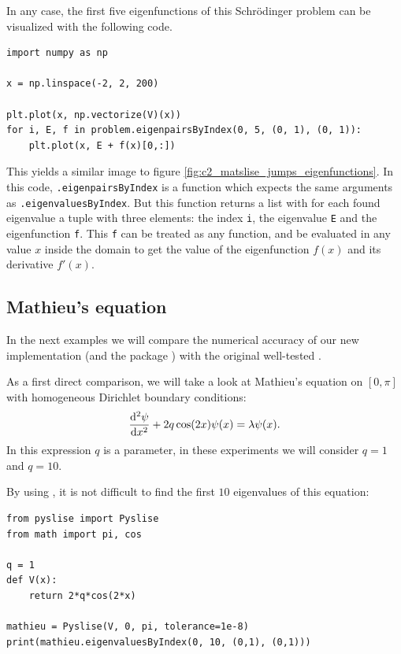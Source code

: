 In any case, the first five eigenfunctions of this Schrödinger problem can be visualized with the following code.
\begin{verbatim}
import numpy as np

x = np.linspace(-2, 2, 200)

plt.plot(x, np.vectorize(V)(x))
for i, E, f in problem.eigenpairsByIndex(0, 5, (0, 1), (0, 1)):
    plt.plot(x, E + f(x)[0,:])
\end{verbatim}
This yields a similar image to figure \ref{fig:c2_matslise_jumps_eigenfunctions}. In this code, \texttt{.eigenpairsByIndex} is a function which expects the same arguments as \texttt{.eigenvaluesByIndex}. But this function returns a list with for each found eigenvalue a tuple with three elements: the index \texttt{i}, the eigenvalue \texttt{E} and the eigenfunction \texttt{f}. This \texttt{f} can be treated as any \lpython{} function, and be evaluated in any value $x$ inside the domain to get the value of the eigenfunction $f(x)$ and its derivative $f'(x)$.

\subsection{Mathieu's equation}\label{sec:c2_numerical_experiments_mathieu}

In the next examples we will compare the numerical accuracy of our new implementation  (and the \lpython{} package \pyslise{}) with the original well-tested .

As a first direct comparison, we will take a look at Mathieu's equation \cite{pryce_sltstpak_1999} on $[0, \pi]$ with homogeneous Dirichlet boundary conditions: \begin{equation}
    \dv[2]{\psi}{x} + 2q\cos(2x)\psi(x) = \lambda\psi(x) \text{.}\label{equ:c2_mathieu_equation}
\end{equation}
In this expression $q$ is a parameter, in these experiments we will consider $q=1$ and $q=10$.

By using \pyslise{}, it is not difficult to find the first $10$ eigenvalues of this equation:

\begin{verbatim}
from pyslise import Pyslise
from math import pi, cos

q = 1
def V(x):
    return 2*q*cos(2*x)

mathieu = Pyslise(V, 0, pi, tolerance=1e-8)
print(mathieu.eigenvaluesByIndex(0, 10, (0,1), (0,1)))
\end{verbatim}

